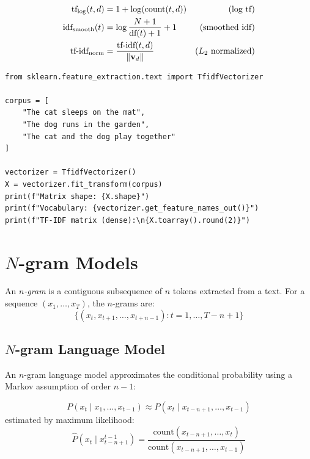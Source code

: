 \begin{keyformulas}[title=\textbf{TF-IDF Variants}]
\begin{align}
\text{tf}_{\log}(t,d) &= 1 + \log(\text{count}(t,d)) & \text{(log tf)} \\
\text{idf}_{\text{smooth}}(t) &= \log\frac{N+1}{\text{df}(t)+1} + 1 & \text{(smoothed idf)} \\
\text{tf-idf}_{\text{norm}} &= \frac{\text{tf-idf}(t,d)}{\left\| \mathbf{v}_d \right\|} & \text{($L_2$ normalized)}
\end{align}
\end{keyformulas}

\begin{codeblock}[title=\textbf{TF-IDF with scikit-learn}]
\begin{verbatim}
from sklearn.feature_extraction.text import TfidfVectorizer

corpus = [
    "The cat sleeps on the mat",
    "The dog runs in the garden",
    "The cat and the dog play together"
]

vectorizer = TfidfVectorizer()
X = vectorizer.fit_transform(corpus)
print(f"Matrix shape: {X.shape}")
print(f"Vocabulary: {vectorizer.get_feature_names_out()}")
print(f"TF-IDF matrix (dense):\n{X.toarray().round(2)}")
\end{verbatim}
\end{codeblock}

\section{$N$-gram Models}
\label{sec:rep:ngrams}

\begin{definition}[$N$-gram]
An \emph{$n$-gram} is a contiguous subsequence of $n$ tokens extracted from a
text. For a sequence $(x_1, \ldots, x_T)$, the $n$-grams are:
\[
\{(x_t, x_{t+1}, \ldots, x_{t+n-1}) : t = 1, \ldots, T - n + 1\}
\]
\end{definition}

\subsection{$N$-gram Language Model}

An $n$-gram language model approximates the conditional probability using a
Markov assumption of order $n-1$:

\begin{definition}
\[
P(x_t \mid x_1, \ldots, x_{t-1}) \approx P(x_t \mid x_{t-n+1}, \ldots, x_{t-1})
\]
estimated by maximum likelihood:
\[
\hat{P}(x_t \mid x_{t-n+1}^{t-1}) = \frac{\text{count}(x_{t-n+1}, \ldots, x_t)}{\text{count}(x_{t-n+1}, \ldots, x_{t-1})}
\]
\end{definition}

